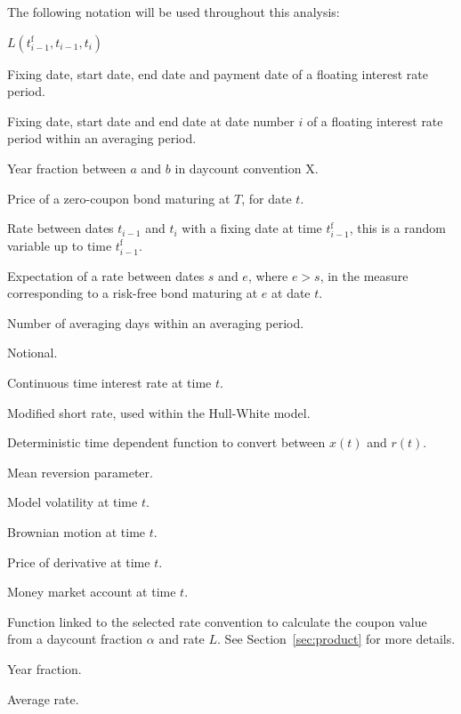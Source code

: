 \documentclass[]{pmv_report} %
\begin{document}
The following notation will be used throughout this analysis:
\begin{deflist}{$L(t_{i-1}^\text{f}, t_{i-1},t_i)$}
\item[$t^\text{f}$, $s$, $e$, $p$]
Fixing date, start date, end date and payment date of a floating interest rate period.
\item[$t_{i-1}^\text{f}, t_{i-1},t_i$]
Fixing date, start date and end date at date number $i$ of a floating interest rate period within an averaging period.
\item[$\alpha^\text{X}(a,b)$]
Year fraction between $a$ and $b$ in daycount convention X.
\item[$P(t,T)$]
Price of a zero-coupon bond maturing at $T$, for date $t$.
\item[$L(t_{i-1}^\text{f}, t_{i-1},t_i)$]
Rate between dates $t_{i-1}$ and $t_i$ with a fixing date at time $t_{i-1}^\text{f}$, this is a random variable up to time $t_{i-1}^\text{f}$.
\item[$F(t, s, e)$]
Expectation of a rate between dates $s$ and $e$, where $e > s$, in the measure corresponding to a risk-free bond maturing at $e$ at date $t$.
\item[$n$] Number of averaging days within an averaging period.
\item[$N$]
Notional.
\item [$r(t)$]
Continuous time interest rate at time $t$.
\item [$x(t)$]
Modified short rate, used within the Hull-White model.
\item [$\psi(0,t)$]
Deterministic time dependent function to convert between $x(t)$ and $r(t)$.
\item [$a$]
Mean reversion parameter.
\item [$\sigma(t)$]
Model volatility at time $t$.
\item [$W(t)$]
Brownian motion at time $t$.
\item [$V(t)$]
Price of derivative at time $t$.
\item[$B(t)$]
Money market account at time $t$.
\item[$f(\alpha, L)$]
Function linked to the selected rate convention to calculate the coupon value from a daycount fraction $\alpha$ and rate $L$. See Section~\ref{sec:product} for more details.
\item[$\alpha$]
Year fraction.
\item[$\bar{L}$]
Average rate.
\end{deflist}
\end{document}
